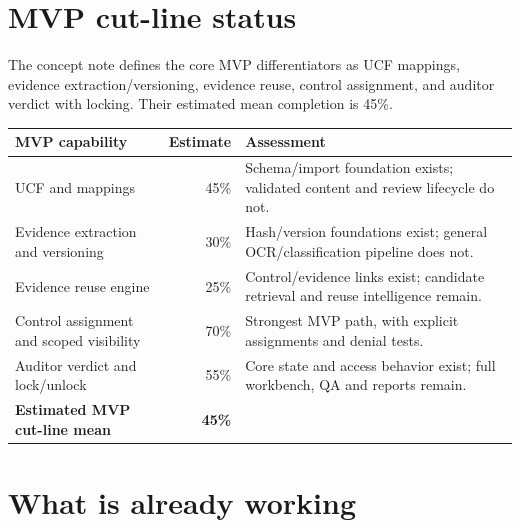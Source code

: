 \documentclass[11pt,a4paper]{article}
\begin{document}
\section{MVP cut-line status}

The concept note defines the core MVP differentiators as UCF mappings, evidence
extraction/versioning, evidence reuse, control assignment, and auditor verdict with
locking. Their estimated mean completion is 45\%.

\begin{center}
\begin{tabularx}{\textwidth}{X r X}
\toprule
MVP capability & Estimate & Assessment \\
\midrule
UCF and mappings & 45\% & Schema/import foundation exists; validated content and review lifecycle do not. \\
Evidence extraction and versioning & 30\% & Hash/version foundations exist; general OCR/classification pipeline does not. \\
Evidence reuse engine & 25\% & Control/evidence links exist; candidate retrieval and reuse intelligence remain. \\
Control assignment and scoped visibility & 70\% & Strongest MVP path, with explicit assignments and denial tests. \\
Auditor verdict and lock/unlock & 55\% & Core state and access behavior exist; full workbench, QA and reports remain. \\
\midrule
\textbf{Estimated MVP cut-line mean} & \textbf{45\%} & \\
\bottomrule
\end{tabularx}
\end{center}

\section{What is already working}
\end{document}
